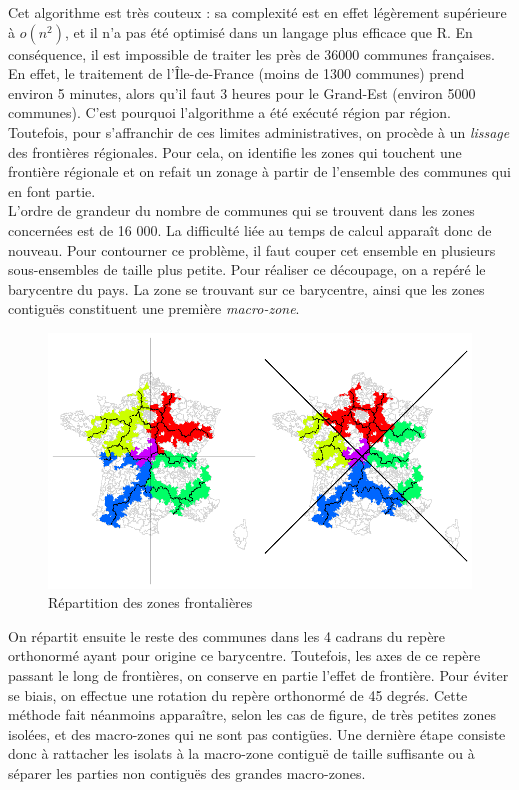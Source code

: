 \documentclass[12pt, a4paper]{article}
\begin{document}
Cet algorithme est très couteux : sa complexité est en effet légèrement supérieure à $o(n^2)$, et il n'a pas été optimisé dans un langage plus efficace que R. En conséquence, il est impossible de traiter les près de 36000 communes françaises. En effet, le traitement de l'Île-de-France (moins de 1300 communes) prend environ 5 minutes, alors qu'il faut 3 heures pour le Grand-Est (environ 5000 communes). C'est pourquoi l'algorithme a été exécuté région par région. Toutefois, pour s'affranchir de ces limites administratives, on procède à un \emph{lissage} des frontières régionales. Pour cela, on identifie les zones qui touchent une frontière régionale et on refait un zonage à partir de l'ensemble des communes qui en font partie.\\
L'ordre de grandeur du nombre de communes qui se trouvent dans les zones concernées est de 16 000. La difficulté liée au temps de calcul apparaît donc de nouveau. Pour contourner ce problème, il faut couper cet ensemble en plusieurs sous-ensembles de taille plus petite. Pour réaliser ce découpage, on a repéré le barycentre du pays. La zone se trouvant sur ce barycentre, ainsi que les zones contiguës constituent une première \emph{macro-zone}.


\begin{center}
\begin{figure}[H]
\caption{Répartition des zones frontalières}
\includegraphics[scale=.7]{img/Methodo_decoupage.png}
\end{figure}
\end{center}


On répartit ensuite le reste des communes dans les 4 cadrans du repère orthonormé ayant pour origine ce barycentre. Toutefois, les axes de ce repère passant le long de frontières, on conserve en partie l'effet de frontière. Pour éviter se biais, on effectue une rotation du repère orthonormé de 45 degrés.
Cette méthode fait néanmoins apparaître, selon les cas de figure, de très petites zones isolées, et des macro-zones qui ne sont pas contigües. Une dernière étape consiste donc à rattacher les isolats à la macro-zone contiguë de taille suffisante ou à séparer les parties non contiguës des grandes macro-zones.
\end{document}
